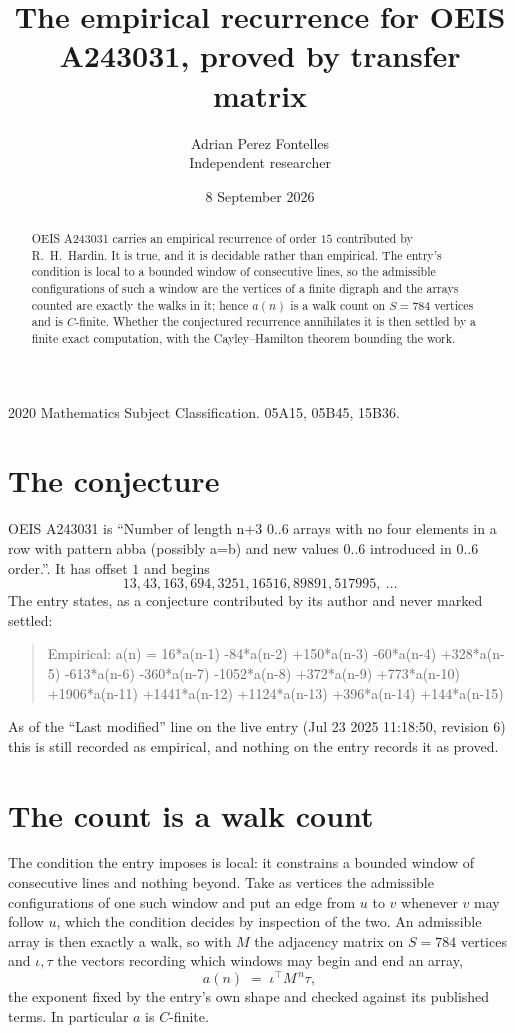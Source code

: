 \documentclass[11pt,a4paper]{article}
\title{The empirical recurrence for OEIS A243031, proved by transfer matrix}
\author{Adrian Perez Fontelles\\ \small Independent researcher}
\date{8 September 2026}
\theoremstyle{plain}
\theoremstyle{definition}
\begin{document}
\maketitle

\begin{abstract}
OEIS A243031 carries an empirical recurrence of order $15$ contributed by R.~H.~Hardin. It is
true, and it is decidable rather than empirical. The entry's condition is local to a bounded window of consecutive lines, so
the admissible configurations of such a window are the vertices of a finite digraph and the
arrays counted are exactly the walks in it; hence $a(n)$ is a walk count on $S=784$ vertices
and is $C$-finite. Whether the conjectured recurrence annihilates it is then settled by a
finite exact computation, with the Cayley--Hamilton theorem bounding the work.
\end{abstract}

\noindent\small 2020 Mathematics Subject Classification. 05A15, 05B45, 15B36.\normalsize

\section{The conjecture}

OEIS A243031 is ``Number of length n+3 0..6 arrays with no four elements in a row with pattern abba (possibly a=b) and new values 0..6 introduced in 0..6 order.''. It has offset $1$ and begins
\[
13, 43, 163, 694, 3251, 16516, 89891, 517995,\ \dots
\]
The entry states, as a conjecture contributed by its author and never marked settled:
\begin{quote}
Empirical: a(n) = 16*a(n-1) -84*a(n-2) +150*a(n-3) -60*a(n-4) +328*a(n-5) -613*a(n-6) -360*a(n-7) -1052*a(n-8) +372*a(n-9) +773*a(n-10) +1906*a(n-11) +1441*a(n-12) +1124*a(n-13) +396*a(n-14) +144*a(n-15)
\end{quote}
As of the ``Last modified'' line on the live entry (Jul 23 2025 11:18:50, revision 6) this is still
recorded as empirical, and nothing on the entry records it as proved.

\section{The count is a walk count}

The condition the entry imposes is local: it constrains a bounded window of consecutive lines and nothing beyond. Take as
vertices the admissible configurations of one such window and put an edge from $u$ to $v$
whenever $v$ may follow $u$, which the condition decides by inspection of the two. An
admissible array is then exactly a walk, so with $M$ the adjacency matrix on $S=784$ vertices
and $\iota,\tau$ the vectors recording which windows may begin and end an array,
\[
a(n)\;=\;\iota^{\!\top}M^{\,n}\tau ,
\]
the exponent fixed by the entry's own shape and checked against its published terms. In
particular $a$ is $C$-finite.
\end{document}

